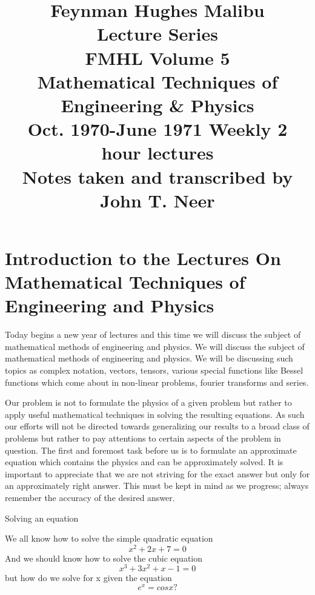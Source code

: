 \documentclass[a4paper,10pt]{article}
\begin{document}
\begin{titlepage} 

\title{{\LARGE \textbf{Feynman Hughes Malibu\\ Lecture Series}} \\
FMHL Volume 5\\
\textbf{Mathematical Techniques of \\ Engineering \& Physics}\\
Oct. 1970-June 1971
Weekly 2 hour lectures\\
Notes taken and transcribed by \\ John T. Neer}
\author{}
\date{}

\maketitle

\end{titlepage}

\renewcommand\contentsname{Lecture}
\tableofcontents
\pagebreak

\section{Introduction to the Lectures On Mathematical Techniques of Engineering and Physics}

Today begins a new year of lectures and this time we will discuss the subject of mathematical methods of engineering and physics.
We will discuss the subject of mathematical methods of engineering and physics.  We will be discussing such topics as complex
 notation, vectors, tensors, various special functions like Bessel functions which come about in non-linear problems, fourier transforms
and series. 

Our problem is not to formulate the physics of a given problem but rather to apply useful mathematical techniques in solving
the resulting equations.  As such our efforts will not be directed towards generalizing our results to a broad class of problems
but rather to pay attentions to certain aspects of the problem in question. The first and foremost task before us is to formulate
an approximate equation which contains the physics and can be approximately solved. It is important to appreciate that we are 
not striving for the exact answer but only for an approximately right answer.  This must be kept in mind as we progress; always 
remember the accuracy of the desired answer.

\begin{center}
 Solving an equation

We all know how to solve the simple quadratic equation
$$ x^2+2x+7=0$$
And we should know how to solve the cubic equation
$$x^3+3x^2+x-1=0$$
but how do we solve for x given the equation
$$e^x=cosx?$$
\end{center}
\end{document}
